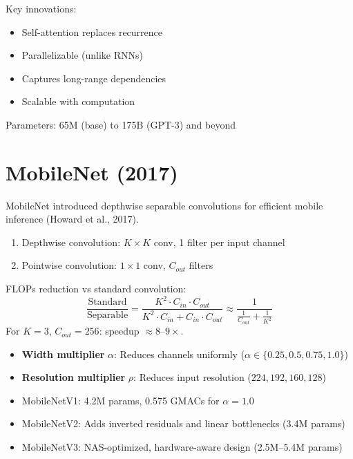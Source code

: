 Key innovations:
\begin{itemize}
    \item Self-attention replaces recurrence
    \item Parallelizable (unlike RNNs)
    \item Captures long-range dependencies
    \item Scalable with computation
\end{itemize}

Parameters: 65M (base) to 175B (GPT-3) and beyond

\section{MobileNet (2017)}

MobileNet introduced depthwise separable convolutions for efficient mobile inference (Howard et al., 2017).

\begin{architecture}
\begin{enumerate}
    \item Depthwise convolution: $K \times K$ conv, 1 filter per input channel
    \item Pointwise convolution: $1 \times 1$ conv, $C_{out}$ filters
\end{enumerate}
FLOPs reduction vs standard convolution:
\begin{equation}
\frac{\text{Standard}}{\text{Separable}} = \frac{K^2 \cdot C_{in} \cdot C_{out}}{K^2 \cdot C_{in} + C_{in} \cdot C_{out}} \approx \frac{1}{\frac{1}{C_{out}} + \frac{1}{K^2}}
\end{equation}
For $K = 3$, $C_{out} = 256$: speedup $\approx 8$--$9\times$.
\end{architecture}

\begin{properties}
\begin{itemize}
    \item \textbf{Width multiplier} $\alpha$: Reduces channels uniformly ($\alpha \in \{0.25, 0.5, 0.75, 1.0\}$)
    \item \textbf{Resolution multiplier} $\rho$: Reduces input resolution ($224, 192, 160, 128$)
    \item MobileNetV1: 4.2M params, 0.575 GMACs for $\alpha = 1.0$
    \item MobileNetV2: Adds inverted residuals and linear bottlenecks (3.4M params)
    \item MobileNetV3: NAS-optimized, hardware-aware design (2.5M--5.4M params)
\end{itemize}
\end{properties}

